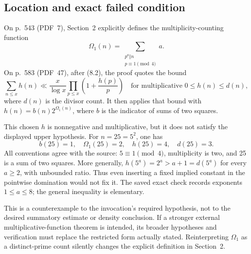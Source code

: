 \documentclass[10pt]{article}
\begin{document}
\subsection*{Location and exact failed condition}
On p. 543 (PDF 7), Section 2 explicitly defines the multiplicity-counting function \[\Omega_1(n)=\sum_{\substack{p^a\Vert n\\p\equiv1\pmod4}} a.\] On p. 583 (PDF 47), after (8.2), the proof quotes the bound \[\sum_{n\le x}h(n)\ll\frac{x}{\log x}
       \prod_{p\le x}\left(1+\frac{h(p)}p\right)
 \quad\text{for multiplicative }0\le h(n)\le d(n),
                                                               \tag{R2}\] where \(d(n)\) is the divisor count. It then applies that bound with \(h(n)=b(n)2^{\Omega_1(n)}\), where \(b\) is the indicator of sums of two squares.\par
This chosen \(h\) is nonnegative and multiplicative, but it does not satisfy the displayed upper hypothesis. For \(n=25=5^2\), one has \[b(25)=1,\quad \Omega_1(25)=2,\quad h(25)=4,\quad d(25)=3.\] All conventions agree with the source: \(5\equiv1\pmod4\), multiplicity is two, and 25 is a sum of two squares. More generally, \(h(5^a)=2^a>a+1=d(5^a)\) for every \(a\ge2\), with unbounded ratio. Thus even inserting a fixed implied constant in the pointwise domination would not fix it. The saved exact check records exponents \(1\le a\le8\); the general inequality is elementary.\par
This is a counterexample to the invocation’s required hypothesis, not to the desired summatory estimate or density conclusion. If a stronger external multiplicative-function theorem is intended, its broader hypotheses and verification must replace the restricted form actually stated. Reinterpreting \(\Omega_1\) as a distinct-prime count silently changes the explicit definition in Section 2.\par
\end{document}
